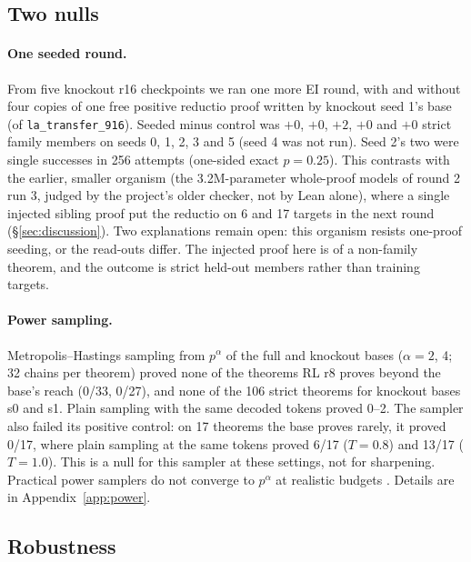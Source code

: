 \subsection{Two nulls}
\label{sec:nulls}

\paragraph{One seeded round.} From five knockout r16 checkpoints we ran one more EI round, with and without four copies of
one free positive reductio proof written by knockout seed 1's base (of \texttt{la\_transfer\_916}). Seeded minus control
was $+0$, $+0$, $+2$, $+0$ and $+0$ strict family members on seeds 0, 1, 2, 3 and 5 (seed 4 was not run). Seed 2's two
were single successes in 256 attempts (one-sided exact $p = 0.25$). This contrasts with the earlier, smaller organism
(the 3.2M-parameter whole-proof models of round 2 run 3, judged by the project's older checker, not by Lean alone),
where a single injected sibling proof put the reductio on 6 and 17 targets in the next round
(\S\ref{sec:discussion}). Two explanations remain open: this organism resists one-proof seeding, or the read-outs
differ. The injected proof here is of a non-family theorem, and the outcome is strict held-out members rather than
training targets.

\paragraph{Power sampling.} Metropolis--Hastings sampling from $p^\alpha$ of the full and knockout bases
\citep{karan2025power} ($\alpha = 2$, 4; 32 chains per theorem) proved none of the theorems RL r8 proves beyond the base's
reach (0/33, 0/27), and none of the 106 strict theorems for knockout bases s0 and s1. Plain sampling with the same decoded
tokens proved 0--2. The sampler also failed its positive control: on 17 theorems the base proves rarely, it proved 0/17,
where plain sampling at the same tokens proved 6/17 ($T=0.8$) and 13/17 ($T=1.0$). This is a null for this sampler at
these settings, not for sharpening. Practical power samplers do not converge to $p^\alpha$ at realistic budgets
\citep{talwar2026power}. Details are in Appendix~\ref{app:power}.

\subsection{Robustness}
\label{sec:robust}

